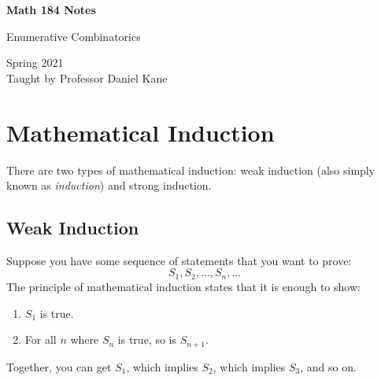 \documentclass[letterpaper]{article}
\begin{document}
\begin{titlepage}
    \begin{center}
        \vspace*{1cm}
            
        \Huge
        \textbf{Math 184 Notes}
            
        \vspace{0.5cm}
        \LARGE
        Enumerative Combinatorics
            
        \vspace{1.5cm}
            
        \vfill
            
        Spring 2021\\
        Taught by Professor Daniel Kane
    \end{center}
\end{titlepage}


\newpage 

\begingroup
    \renewcommand\contentsname{Table of Contents}
    \tableofcontents
\endgroup

\newpage
{}


\section{Mathematical Induction}
There are two types of mathematical induction: weak induction (also simply known as \emph{induction}) and strong induction. 

\subsection{Weak Induction}
Suppose you have some sequence of statements that you want to prove:
\[ S_1, S_2, \dots, S_n, ...\]
The principle of mathematical induction states that it is enough to show:
\begin{enumerate}
    \item $S_1$ is true.
    \item For all $n$ where $S_n$ is true, so is $S_{n + 1}$. 
\end{enumerate}
Together, you can get $S_1$, which implies $S_2$, which implies $S_3$, and so on. 

\bigskip 
\end{document}
